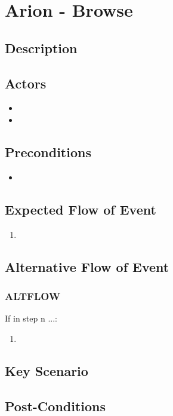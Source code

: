 \documentclass{scrreprt}
\begin{document}
\chapter*{Arion - Browse}

\section*{Description}

\section*{Actors}
\begin{itemize}
    \item 
    \item 
\end{itemize}

\section*{Preconditions}
\begin{itemize}
    \item 
\end{itemize}

\section*{Expected Flow of Event}
\begin{enumerate}[1.]
    \item 
\end{enumerate}

\section*{Alternative Flow of Event}
\subsection*{ALTFLOW}
If in step n ...:
\begin{enumerate}
    \item 
\end{enumerate}

\section*{Key Scenario}

\section*{Post-Conditions}
\end{document}
